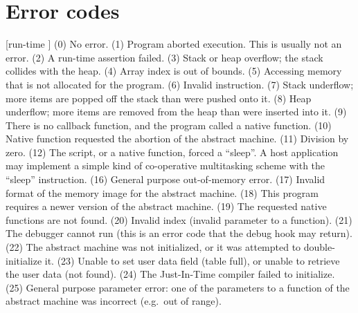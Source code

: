 \section{Error codes}
\bigskip
{} [run-time \midtilde]
\beginlist{35pt} \compactlist
{} \hfil (0) \break
  No error.
 \hfil (1) \break
  Program aborted execution. This is usually not an error.
 \hfil (2) \break
  A run-time assertion failed.
 \hfil (3) \break
  Stack or heap overflow; the stack collides with the heap.
 \hfil (4) \break
  Array index is out of bounds.
 \hfil (5) \break
  Accessing memory that is not allocated for the program.
 \hfil (6) \break
  Invalid instruction.
 \hfil (7) \break
  Stack underflow; more items are popped off the stack than were pushed onto it.
 \hfil (8) \break
  Heap underflow; more items are removed from the heap than were inserted into
  it.
 \hfil (9) \break
  There is no callback function, and the program called a native function.
 \hfil (10) \break
  Native function requested the abortion of the abstract machine.
 \hfil (11) \break
  Division by zero.
 \hfil (12) \break
  The script, or a native function, forced a ``sleep''. A host application may
  implement a simple kind of co-operative multitasking scheme with the ``sleep''
  instruction.
 \hfil (16) \break
  General purpose out-of-memory error.
 \hfil (17) \break
  Invalid format of the memory image for the abstract machine.
 \hfil (18) \break
  This program requires a newer version of the abstract machine.
 \hfil (19) \break
  The requested native functions are not found.
 \hfil (20) \break
  Invalid index (invalid parameter to a function).
 \hfil (21) \break
  The debugger cannot run (this is an error code that the debug hook may return).
 \hfil (22) \break
  The abstract machine was not initialized, or it was attempted to
  double-initialize it.
 \hfil (23) \break
  Unable to set user data field (table full), or unable to retrieve the user data
  (not found).
 \hfil (24) \break
  The Just-In-Time compiler failed to initialize.
 \hfil (25) \break
  General purpose parameter error: one of the parameters to a function of the
  abstract machine was incorrect (e.g.\ out of range).
\endlist

%
%
